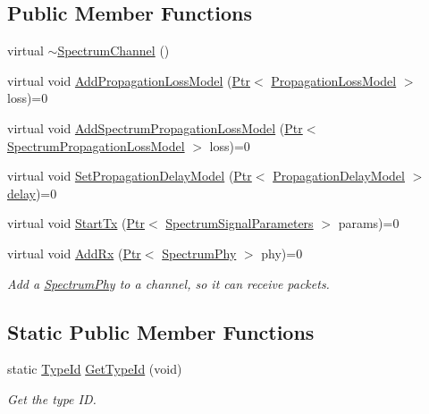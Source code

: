 \subsection*{Public Member Functions}
\begin{DoxyCompactItemize}
\item 
virtual \hyperlink{classns3_1_1SpectrumChannel_a40e935866f2da18ce7f752b5f5dfddf4}{$\sim$\+Spectrum\+Channel} ()
\item 
virtual void \hyperlink{classns3_1_1SpectrumChannel_a4a7128e8c598bd827688639e5770fcfb}{Add\+Propagation\+Loss\+Model} (\hyperlink{classns3_1_1Ptr}{Ptr}$<$ \hyperlink{classns3_1_1PropagationLossModel}{Propagation\+Loss\+Model} $>$ loss)=0
\item 
virtual void \hyperlink{classns3_1_1SpectrumChannel_a283b03135f8ae8706d817440e812b8c6}{Add\+Spectrum\+Propagation\+Loss\+Model} (\hyperlink{classns3_1_1Ptr}{Ptr}$<$ \hyperlink{classns3_1_1SpectrumPropagationLossModel}{Spectrum\+Propagation\+Loss\+Model} $>$ loss)=0
\item 
virtual void \hyperlink{classns3_1_1SpectrumChannel_acd6d800ff927ead307b49d3fa37f32b7}{Set\+Propagation\+Delay\+Model} (\hyperlink{classns3_1_1Ptr}{Ptr}$<$ \hyperlink{classns3_1_1PropagationDelayModel}{Propagation\+Delay\+Model} $>$ \hyperlink{mmwave_2model_2fading-traces_2fading__trace__generator_8m_a7964e6aa8f61a9d28973c8267a606ad8}{delay})=0
\item 
virtual void \hyperlink{classns3_1_1SpectrumChannel_a16ed0d6375582f739bd9beb770106083}{Start\+Tx} (\hyperlink{classns3_1_1Ptr}{Ptr}$<$ \hyperlink{structns3_1_1SpectrumSignalParameters}{Spectrum\+Signal\+Parameters} $>$ params)=0
\item 
virtual void \hyperlink{classns3_1_1SpectrumChannel_ad59f405527de70c8cf52118b2eff8bc5}{Add\+Rx} (\hyperlink{classns3_1_1Ptr}{Ptr}$<$ \hyperlink{classns3_1_1SpectrumPhy}{Spectrum\+Phy} $>$ phy)=0
\begin{DoxyCompactList}\small\item\em Add a \hyperlink{classns3_1_1SpectrumPhy}{Spectrum\+Phy} to a channel, so it can receive packets. \end{DoxyCompactList}\end{DoxyCompactItemize}
\subsection*{Static Public Member Functions}
\begin{DoxyCompactItemize}
\item 
static \hyperlink{classns3_1_1TypeId}{Type\+Id} \hyperlink{classns3_1_1SpectrumChannel_a59761379251a5fce5b601faa76ae9fae}{Get\+Type\+Id} (void)
\begin{DoxyCompactList}\small\item\em Get the type ID. \end{DoxyCompactList}\end{DoxyCompactItemize}
